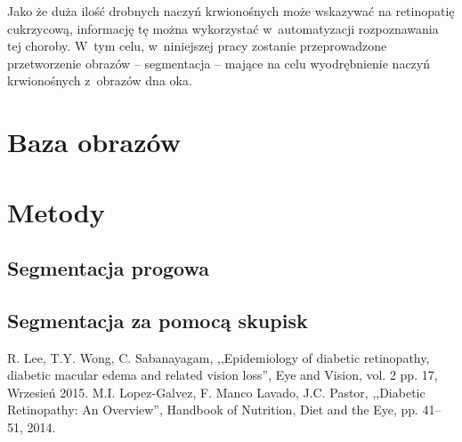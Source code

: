 \documentclass[conference]{IEEEtran}
\begin{document}
Jako że duża ilość drobnych naczyń krwionośnych może wskazywać na retinopatię cukrzycową, informację tę można wykorzystać w~automatyzacji rozpoznawania tej choroby. W~tym celu, w~niniejszej pracy zostanie przeprowadzone przetworzenie obrazów -- segmentacja -- mające na celu wyodrębnienie naczyń krwionośnych z~obrazów dna oka.

\section{Baza obrazów}
\section{Metody}

\subsection{Segmentacja progowa}
\subsection{Segmentacja za pomocą skupisk}

\begin{thebibliography}{00}
 R. Lee, T.Y. Wong, C. Sabanayagam, ,,Epidemiology of diabetic retinopathy, diabetic macular edema and related vision loss'', Eye and Vision, vol. 2 pp. 17, Wrzesień 2015.
 M.I. Lopez-Galvez, F. Manco Lavado, J.C. Pastor, ,,Diabetic Retinopathy: An Overview'', Handbook of Nutrition, Diet and the Eye, pp. 41--51, 2014.
\end{thebibliography}
\end{document}
